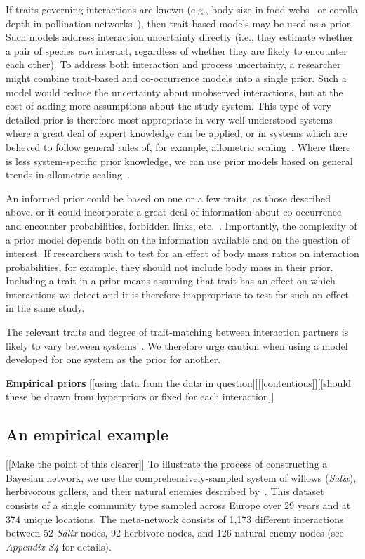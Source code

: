 \documentclass[12pt]{article}
\begin{document}
\begin{spacing}{2.0}
        If traits governing interactions are known (e.g., body size in food webs~\citep{Gravel2013} or corolla depth in pollination networks~\citep{Weinstein2017a,Graham}), then trait-based models may be used as a prior. Such models address interaction uncertainty directly (i.e., they estimate whether a pair of species \emph{can} interact, regardless of whether they are likely to encounter each other). To address both interaction and process uncertainty, a researcher might combine trait-based and co-occurrence models into a single prior. Such a model would reduce the uncertainty about unobserved interactions, but at the cost of adding more assumptions about the study system. This type of very detailed prior is therefore most appropriate in very well-understood systems where a great deal of expert knowledge can be applied, or in systems which are believed to follow general rules of, for example, allometric scaling~\citep{Gravel2013}. Where there is less system-specific prior knowledge, we can use prior models based on general trends in allometric scaling~\citep{Riede2011,Gravel2013}.


        An informed prior could be based on one or a few traits, as those described above, or it could incorporate a great deal of information about co-occurrence and encounter probabilities, forbidden links, etc.~\citep{Jordano2016}. Importantly, the complexity of a prior model depends both on the information available and on the question of interest. If researchers wish to test for an effect of body mass ratios on interaction probabilities, for example, they should not include body mass in their prior. Including a trait in a prior means assuming that trait has an effect on which interactions we detect and it is therefore inappropriate to test for such an effect in the same study.


        The relevant traits and degree of trait-matching between interaction partners is likely to vary between systems~\citep{Gravel2013,Weinstein2017a}. We therefore urge caution when using a model developed for one system as the prior for another. 


      \textbf{Empirical priors} [[using data from the data in question]][[contentious]][[should these be drawn from hyperpriors or fixed for each interaction]]


  \subsection*{An empirical example}
    [[Make the point of this clearer]]
      To illustrate the process of constructing a Bayesian network, we use the comprehensively-sampled system of willows (\emph{Salix}), herbivorous gallers, and their natural enemies described by~\citet{Kopelke2017}. This dataset consists of a single community type sampled across Europe over 29 years and at 374 unique locations. The meta-network consists of 1,173 different interactions between 52 \emph{Salix} nodes, 92 herbivore nodes, and 126 natural enemy nodes (see \emph{Appendix S4} for details). 



\end{spacing}
\end{document}
